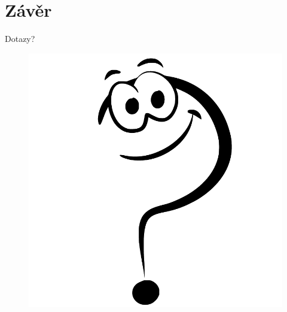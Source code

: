 \documentclass[11pt,aspectratio=169]{beamer}
\begin{document}
    \section{Závěr}
    \begin{frame}{Dotazy?}
        \begin{figure}
            \centering
            \includegraphics[scale=.5]{../images/discussion.pdf}
        \end{figure}
    \end{frame}
\end{document}
